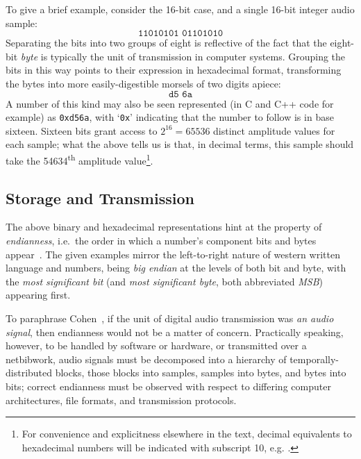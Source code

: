 To give a brief example, consider the 16-bit case, and a single 16-bit integer
audio sample:
\begin{equation*}
    \texttt{11010101 01101010}
\end{equation*}
Separating the bits into two groups of eight is reflective of the fact that the
eight-bit \textit{byte} is typically the unit of transmission in computer
systems.
Grouping the bits in this way points to their expression in hexadecimal format,
transforming the bytes into more easily-digestible morsels of two digits apiece:
\begin{equation*}
    \texttt{d5 6a}
\end{equation*}
A number of this kind may also be seen represented (in C and C++ code for
example) as \texttt{0xd56a}, with `\texttt{0x}' indicating that the number to
follow is in base sixteen.
Sixteen bits grant access to $2^{16}=\num{65536}$ distinct amplitude values for
each sample; what the above tells us is that, in decimal terms, this sample
should take the \num{54634}\textsuperscript{th} amplitude value\footnote{
    For convenience and explicitness elsewhere in the text, decimal equivalents
    to hexadecimal numbers will be indicated with subscript 10, e.g.
    .
}.

\subsection{Storage and Transmission}\label{subsec:storage-and-transmission}

The above binary and hexadecimal representations hint at the property of
\textit{endianness}, i.e.\ the order in which a number's component bits and
bytes appear~\citep{cohen_holy_1981}.
The given examples mirror the left-to-right nature of western written language
and numbers, being \textit{big endian} at the levels of both bit and byte, with
the \textit{most significant bit} (and \textit{most significant byte}, both
abbreviated \textit{MSB}) appearing first.

To paraphrase Cohen~\citep{cohen_holy_1981}, if the unit of digital audio
transmission was \textit{an audio signal}, then endianness would not be a
matter of concern.
Practically speaking, however, to be handled by software or hardware, or
transmitted over a netbibwork, audio signals must be decomposed into a hierarchy
of temporally-distributed blocks, those blocks into samples, samples into bytes,
and bytes into bits;
correct endianness must be observed with respect to differing computer
architectures, file formats, and transmission protocols.

